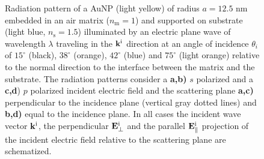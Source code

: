 \begin{figure}[h!]
    \caption[  Radiation pattern of a AuNP supported on a substrate illuminated at oblique incidence ]{Radiation pattern of a AuNP (light yellow) of radius $a = 12.5$ nm embedded in an air matrix ($n_\text{m} = 1$) and supported on  substrate (light blue, $n_\text{s} = 1.5$) illuminated by an electric plane wave of  wavelength $\lambda$ traveling in the $\vb{k}^\text{i}$ direction at an angle of incidence $\theta_i$ of $15^\circ$ (black),  $38^\circ$ (orange),  $42^\circ$ (blue) and  $75^\circ$ (light orange) relative to the normal direction to the interface between the matrix and the substrate. The radiation patterns consider a \textbf{a,b)} $s$ polarized and  a \textbf{c,d}) $p$ polarized incident electric field and the scattering plane \textbf{a,c)} perpendicular to the incidence plane (vertical gray dotted lines) and \textbf{b,d)} equal to the incidence plane. In all cases the incident wave vector $\vb{k}^\text{i}$, the perpendicular $\vb{E}_\perp^\text{i}$ and the  parallel $\vb{E}_\parallel^\text{i}$ projection of the incident electric field relative to the scattering plane are schematized.    }
    \label{fig:Far:Inc:s}
\end{figure}


